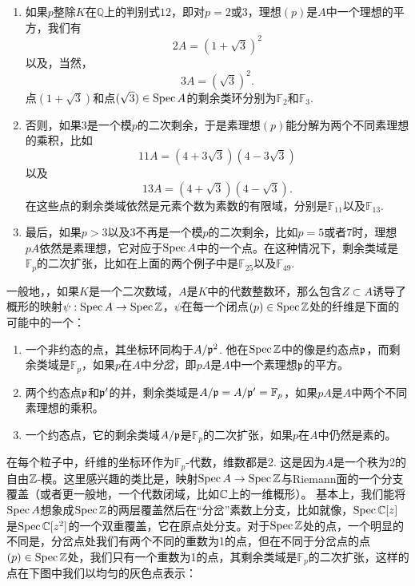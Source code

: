 \begin{enumerate}[{(1)}]\setlength{\itemsep}{0pt}
	\item 如果$p$整除$K$在$\mathbb{Q}$上的判别式$12$，即对$p=2$或$3$，理想$(p)$是$A$中一个理想的平方，我们有
	\[
	2A=(1+\sqrt{3})^2
	\]
	以及，当然，
	\[
	3A=(\sqrt{3})^2.
	\]
	点$(1+\sqrt{3})$和点$(\sqrt{3})\in\operatorname{Spec} A$的剩余类环分别为$\mathbb{F}_2$和$\mathbb{F}_3$.

	\item 否则，如果$3$是一个模$p$的二次剩余，于是素理想$(p)$能分解为两个不同素理想的乘积，比如
	\[
	11A=(4+3\sqrt{3})(4-3\sqrt{3})
	\]
	以及
	\[
	13A=(4+\sqrt{3})(4-\sqrt{3}).
	\]
	在这些点的剩余类域依然是元素个数为素数的有限域，分别是$\mathbb{F}_{11}$以及$\mathbb{F}_{13}$.

	\item 最后，如果$p>3$以及$3$不再是一个模$p$的二次剩余，比如$p=5$或者$7$时，理想$pA$依然是素理想，它对应于$\operatorname{Spec} A$中的一个点。在这种情况下，剩余类域是$\mathbb{F}_p$的二次扩张，比如在上面的两个例子中是$\mathbb{F}_{25}$以及$\mathbb{F}_{49}$.
\end{enumerate}

一般地，，如果$K$是一个二次数域，$A$是$K$中的代数整数环，那么包含$Z\subset A$诱导了概形的映射$\psi:\operatorname{Spec} A\to \operatorname{Spec} \mathbb{Z}$，$\psi$在每一个闭点$(p)\in \operatorname{Spec} \mathbb{Z}$处的纤维是下面的可能中的一个：

\begin{enumerate}[{(1)}]\setlength{\itemsep}{0pt}
	\item 一个非约态的点，其坐标环同构于$A/\mathfrak{p}^2$. 他在$\operatorname{Spec} \mathbb{Z}$中的像是约态点$\mathfrak{p}$，而剩余类域是$\mathbb{F}_p$，如果$p$在$A$中\textit{分岔}，即$pA$是$A$中一个素理想$\mathfrak{p}$的平方。

	\item 两个约态点$\mathfrak{p}$和$\mathfrak{p}'$的并，剩余类域是$A/\mathfrak{p}=A/\mathfrak{p}'=\mathbb{F}_p$，如果$pA$是$A$中两个不同素理想的乘积。

	\item 一个约态点，它的剩余类域$A/\mathfrak{p}$是$\mathbb{F}_p$的二次扩张，如果$p$在$A$中仍然是素的。
\end{enumerate}

在每个粒子中，纤维的坐标环作为$\mathbb{F}_p$-代数，维数都是2. 这是因为$A$是一个秩为2的自由$\mathbb{Z}$-模。这里感兴趣的类比是，映射$\operatorname{Spec} A\to \operatorname{Spec} \mathbb{Z}$与Riemann面的一个分支覆盖（或者更一般地，一个代数闭域，比如$\mathbb{C}$上的一维概形）。 基本上，我们能将$\operatorname{Spec} A$想象成$\operatorname{Spec} \mathbb{Z}$的两层覆盖然后在“分岔”素数上分支，比如就像，$\operatorname{Spec} \mathbb{C}[z]$是$\operatorname{Spec} \mathbb{C}[z^2]$的一个双重覆盖，它在原点处分支。对于$\operatorname{Spec} \mathbb{Z}$处的点，一个明显的不同是，分岔点处我们有两个不同的重数为1的点，但在不同于分岔点的点$(p)\in \operatorname{Spec} \mathbb{Z}$处，我们只有一个重数为1的点，其剩余类域是$\mathbb{F}_p$的二次扩张，这样的点在下图中我们以均匀的灰色点表示：


